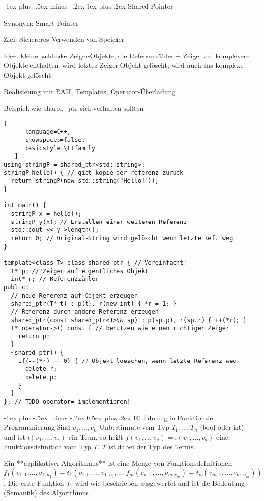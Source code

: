 \documentclass[10pt]{article}
\makeatletter
\renewcommand{\section}{\@startsection{section}{1}{0mm}%
                                {-1ex plus -.5ex minus -.2ex}%
                                {0.5ex plus .2ex}%
                                {\normalfont\large\bfseries}}
\renewcommand{\subsubsection}{\@startsection{subsubsection}{3}{0mm}%
                                {-1ex plus -.5ex minus -.2ex}%
                                {1ex plus .2ex}%
                                {\normalfont\small\bfseries}}
\makeatother
\begin{document}
\subsubsection{Shared Pointer}
\begin{itemize*}
  \item Synonym: Smart Pointer
  \item Ziel: Sichereres Verwenden von Speicher
  \item Idee: kleine, schlanke Zeiger-Objekte, die Referenzzähler + Zeiger auf komplexere Objekte enthalten, wird letztes Zeiger-Objekt gelöscht, wird auch das komplexe Objekt gelöscht
  \item Realisierung mit RAII, Templates, Operator-Überladung
  \item Beispiel, wie shared\_ptr sich verhalten sollten
\end{itemize*}
\begin{lstlisting}[
      language=C++,
      showspaces=false,
      basicstyle=\ttfamily
   ]
using stringP = shared_ptr<std::string>;
stringP hello() { // gibt kopie der referenz zurück
  return stringP(new std::string("Hello!"));
}

int main() {
  stringP x = hello();
  stringP y(x); // Erstellen einer weiteren Referenz
  std::cout << y->length();
  return 0; // Original-String wird gelöscht wenn letzte Ref. weg
}

template<class T> class shared_ptr { // Vereinfacht!
  T* p; // Zeiger auf eigentliches Objekt
  int* r; // Referenzzähler
public:
  // neue Referenz auf Objekt erzeugen
  shared_ptr(T* t) : p(t), r(new int) { *r = 1; }
  // Referenz durch andere Referenz erzeugen
  shared_ptr(const shared_ptr<T>\& sp) : p(sp.p), r(sp.r) { ++(*r); }
  T* operator->() const { // benutzen wie einen richtigen Zeiger
    return p;
  }
  ~shared_ptr() {
    if(--(*r) == 0) { // Objekt loeschen, wenn letzte Referenz weg
      delete r;
      delete p;
    }
  }
}; // TODO operator= implementieren!
\end{lstlisting}


\section{Einführung in Funktionale Programmierung}
Sind $v_1, ..., v_n$ Unbestimmte vom Typ $T_1, ..., T_n$ (bool oder int) und ist $t(v_1,...,v_n)$ ein Term, so heißt $f(v_1,...,v_n)= t(v_1,...,v_n)$ eine Funktionsdefinition vom Typ $T$. $T$ ist dabei der Typ des Terms.

Ein **applikativer Algorithmus** ist eine Menge von Funktionsdefinitionen $f_1(v_{1,1}, ..., v_{1,n_1}) = t_1(v_{1,1},...,v_{1,n_1},..., f_m(v_{m,1},...,v_{m,n_m}) = t_m(v_{m,1},..., v_{m,n_m}))$. Die erste Funktion $f_1$ wird wie beschrieben ausgewertet und ist die Bedeutung (Semantik) des Algorithmus.
\end{document}
